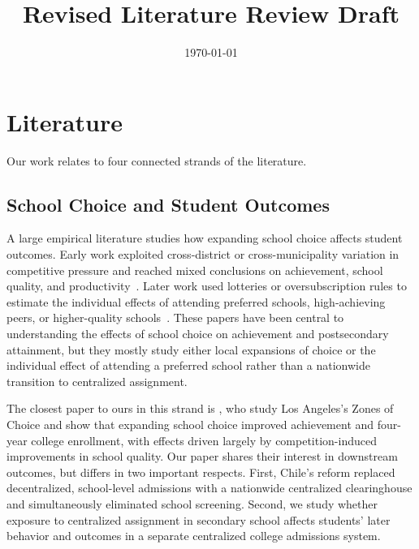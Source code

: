 \documentclass[11pt]{article}
\title{Revised Literature Review Draft}
\author{}
\date{\today}
\begin{document}
\maketitle

\section{Literature}
Our work relates to four connected strands of the literature.

\subsection{School Choice and Student Outcomes}
A large empirical literature studies how expanding school choice affects student outcomes. Early work exploited cross-district or cross-municipality variation in competitive pressure and reached mixed conclusions on achievement, school quality, and productivity~\citep{hoxby2000,hoxby2003,hsieh2006,rothstein2007}. Later work used lotteries or oversubscription rules to estimate the individual effects of attending preferred schools, high-achieving peers, or higher-quality schools~\citep{cullen2006,abdulkadiroglu2011,deming2014,muralidharan2015}. These papers have been central to understanding the effects of school choice on achievement and postsecondary attainment, but they mostly study either local expansions of choice or the individual effect of attending a preferred school rather than a nationwide transition to centralized assignment.

The closest paper to ours in this strand is \citet{camposkearns2024}, who study Los Angeles's Zones of Choice and show that expanding school choice improved achievement and four-year college enrollment, with effects driven largely by competition-induced improvements in school quality. Our paper shares their interest in downstream outcomes, but differs in two important respects. First, Chile's reform replaced decentralized, school-level admissions with a nationwide centralized clearinghouse and simultaneously eliminated school screening. Second, we study whether exposure to centralized assignment in secondary school affects students' later behavior and outcomes in a separate centralized college admissions system.
\end{document}
